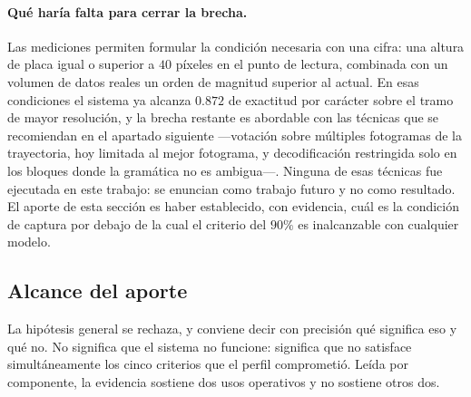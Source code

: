 \paragraph{Qué haría falta para cerrar la brecha.}
Las mediciones permiten formular la condición necesaria con una cifra: una altura
de placa igual o superior a $40$ píxeles en el punto de lectura, combinada con un
volumen de datos reales un orden de magnitud superior al actual. En esas
condiciones el sistema ya alcanza $0{.}872$ de exactitud por carácter sobre el
tramo de mayor resolución, y la brecha restante es abordable con las técnicas que
se recomiendan en el apartado siguiente ---votación sobre múltiples fotogramas de
la trayectoria, hoy limitada al mejor fotograma, y decodificación restringida
solo en los bloques donde la gramática no es ambigua---. Ninguna de esas técnicas
fue ejecutada en este trabajo: se enuncian como trabajo futuro y no como
resultado. El aporte de esta sección es haber establecido, con evidencia, cuál es
la condición de captura por debajo de la cual el criterio del $90\%$ es
inalcanzable con cualquier modelo.

\subsection{Alcance del aporte}

La hipótesis general se rechaza, y conviene decir con precisión qué significa eso y
qué no. No significa que el sistema no funcione: significa que no satisface
simultáneamente los cinco criterios que el perfil comprometió. Leída por componente,
la evidencia sostiene dos usos operativos y no sostiene otros dos.

